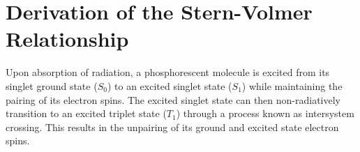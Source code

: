 
\chapter{Derivation of the Stern-Volmer Relationship}

Upon absorption of radiation, a phosphorescent molecule is excited from its singlet ground state ($S_0$) to an excited singlet state ($S_1$) while maintaining the pairing of its electron spins. The excited singlet state can then non-radiatively transition to an excited triplet state ($T_1$) through a process known as intersystem crossing. This results in the unpairing of its ground and excited state electron spins.

